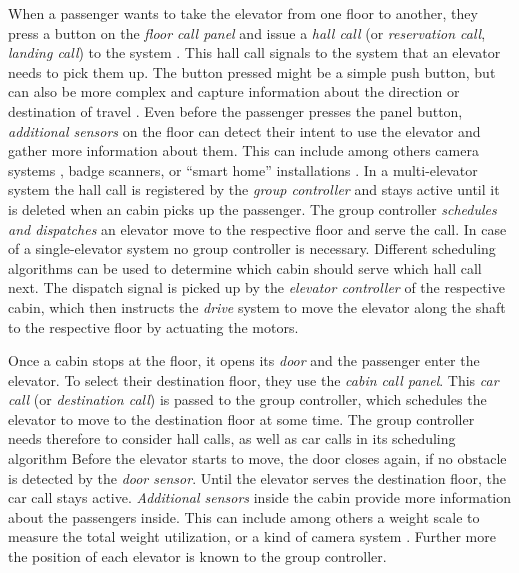 When a passenger wants to take the elevator from one floor to another,
they press a button on the \emph{floor call panel} and issue a \emph{hall call} (or \emph{reservation call}, \emph{landing call}) to the system \autocite[][pp.~6--10]{siikonen1997models}.
This hall call signals to the system that an elevator needs to pick them up.
The button pressed might be a simple push button, but can also be more complex 
and capture information about the direction or destination of travel \autocite[][pp.~89--93]{unger2015aufzuege}.
Even before the passenger presses the panel button, \emph{additional sensors} 
on the floor can detect their intent to use the elevator and gather more information about them.
This can include among others camera systems \autocite[][]{lin2011control}, badge scanners, or \enquote{smart home} installations \autocite[][]{kwon2014sensor}.
In a multi-elevator system the hall call is registered by the \emph{group controller} and stays active until it is deleted when an cabin picks up the passenger.
The group controller \emph{schedules and dispatches} an elevator move to the respective floor and serve the call.
In case of a single-elevator system no group controller is necessary.
Different scheduling algorithms can be used to determine which cabin should serve which hall call next.
The dispatch signal is picked up by the \emph{elevator controller} of the respective cabin, which then instructs the \emph{drive} system to move the elevator along the shaft to the respective floor by actuating the motors.

Once a cabin stops at the floor, it opens its \emph{door} and the passenger enter the elevator.
To select their destination floor, they use the \emph{cabin call panel}.
This \emph{car call} (or \emph{destination call}) \autocite[][pp.~6--10]{siikonen1997models} is passed to the group controller, 
which schedules the elevator to move to the destination floor at some time.
The group controller needs therefore to consider hall calls, as well as car calls in its scheduling algorithm
Before the elevator starts to move, the door closes again, if no obstacle is detected by the \emph{door sensor}.
Until the elevator serves the destination floor, the car call stays active.
\emph{Additional sensors} inside the cabin provide more information about the passengers inside.
This can include among others a weight scale to measure the total weight utilization, or a kind of camera system \autocite[][]{xang2016trafficlist}.
Further more the position of each elevator is known to the group controller.

